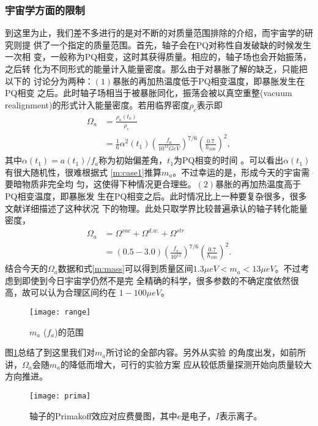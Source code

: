 \documentclass[twocolumn,12pt,a4paper]{article}
\begin{document}
\subsubsection{宇宙学方面的限制}
到这里为止，我们差不多进行的是对不断的对质量范围排除的介绍，而宇宙学的研究则提
供了一个指定的质量范围。首先，轴子会在PQ对称性自发破缺的时候发生一次相
变，一般称为PQ相变，这时其获得质量。相应的，轴子场也会开始振荡，之后转
化为不同形式的能量计入能量密度。那么由于对暴胀了解的缺乏，只能把以下的
讨论分为两种：$(1)$暴胀的再加热温度低于PQ相变温度，即暴胀发生在PQ相变
之后。此时轴子场相当于被暴胀同化，振荡会被以真空重整(vacuum
realignment)的形式计入能量密度。若用临界密度$\rho_c$表示即
\begin{equation}
  \label{m:case1}
  \begin{split}
    \Omega_a &= \frac{\rho_a(t_0)}{\rho_c} \\
    &=
    \frac{1}{6}\alpha^2(t_1)(\frac{f_a}{10^{12}GeV})^{7/6}(\frac{0.7}{h_{100}})^2,
  \end{split}
\end{equation}
其中$\alpha(t_1) = a(t_1)/f_a$称为初始偏差角，$t_1$为PQ相变的时间
\cite{asztalos01}。可以看出$\alpha(t_1)$有很大随机性，很难根据式
\ref{m:case1}推算$m_a$。不过幸运的是，形成今天的宇宙需要暗物质非完全均
匀，这使得下种情况更合理些。$(2)$暴胀的再加热温度高于PQ相变温度，即暴胀发
生在PQ相变之后。此时情况比上一种要复杂很多，很多文献详细描述了这种状况
下的物理。此处只取学界比较普遍承认的轴子转化能量密度，
\begin{equation}
  \label{m:case2}
  \begin{split}
    \Omega_a &= \Omega^{vac}+\Omega^{d.w.}+\Omega^{str}\\
&= (0.5-3.0)(\frac{f_a}{10^{12}})^{7/6}(\frac{0.7}{h_{100}})^2.
  \end{split}
\end{equation}
结合今天的$\Omega_a$数据和式\ref{m:mass}可以得到质量区间$1.3\mu eV <
m_a < 13\mu eV$\cite{asztalos01}。不过考虑到即使到今日宇宙学仍然不是完
全精确的科学，很多参数的不确定度依然很高，故可以认为合理区间约在
$1-100\mu eV$。\par
\begin{figure}
  \centering
  \texttt{[image: range]}
  \caption{$m_a$ ($f_a$)的范围}
  \label{fig:constr}
\end{figure}
图\ref{fig:constr}总结了到这里我们对$m_a$所讨论的全部内容。另外从实验
的角度出发，如前所讲，$\Omega_a$会随$m_a$的降低而增大，可行的实验方案
应从较低质量探测开始向质量较大方向推进。
\begin{figure}[h!]
  \centering
  \texttt{[image: prima]}
  \caption{轴子的Primakoff效应对应费曼图，其中$e$是电子，$I$表示离子。}
  \label{f:prima}
\end{figure}
\end{document}
